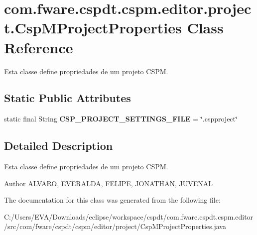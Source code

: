 \hypertarget{classcom_1_1fware_1_1cspdt_1_1cspm_1_1editor_1_1project_1_1_csp_m_project_properties}{}\section{com.\+fware.\+cspdt.\+cspm.\+editor.\+project.\+Csp\+M\+Project\+Properties Class Reference}
\label{classcom_1_1fware_1_1cspdt_1_1cspm_1_1editor_1_1project_1_1_csp_m_project_properties}


Esta classe define propriedades de um projeto C\+S\+PM.  


\subsection*{Static Public Attributes}
\begin{DoxyCompactItemize}
\item 
\mbox{\label{classcom_1_1fware_1_1cspdt_1_1cspm_1_1editor_1_1project_1_1_csp_m_project_properties_a0158c0d2b534b25ab11c3d2a51483cde}} 
static final String {\bfseries C\+S\+P\+\_\+\+P\+R\+O\+J\+E\+C\+T\+\_\+\+S\+E\+T\+T\+I\+N\+G\+S\+\_\+\+F\+I\+LE} = \char`\"{}.cspproject\char`\"{}
\end{DoxyCompactItemize}


\subsection{Detailed Description}
Esta classe define propriedades de um projeto C\+S\+PM. 

\begin{DoxyAuthor}{Author}
A\+L\+V\+A\+RO, E\+V\+E\+R\+A\+L\+DA, F\+E\+L\+I\+PE, J\+O\+N\+A\+T\+H\+AN, J\+U\+V\+E\+N\+AL 
\end{DoxyAuthor}


The documentation for this class was generated from the following file\+:\begin{DoxyCompactItemize}
\item 
C\+:/\+Users/\+E\+V\+A/\+Downloads/eclipse/workspace/cspdt/com.\+fware.\+cspdt.\+cspm.\+editor/src/com/fware/cspdt/cspm/editor/project/Csp\+M\+Project\+Properties.\+java\end{DoxyCompactItemize}
